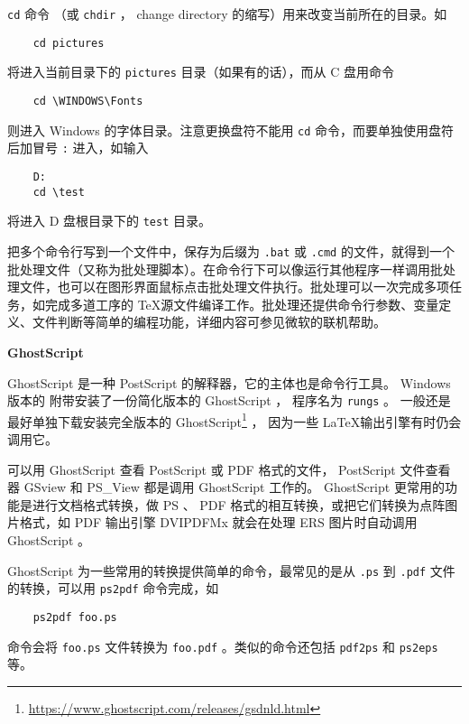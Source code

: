 \verb|cd| 命令 （或 \verb|chdir| ， change directory 的缩写）用来改变当前所在的目录。如
\begin{lstlisting}
    cd pictures
\end{lstlisting}
将进入当前目录下的 \verb|pictures| 目录（如果有的话），而从 C 盘用命令
\begin{lstlisting}
    cd \WINDOWS\Fonts
\end{lstlisting}
则进入 Windows 的字体目录。注意更换盘符不能用 \verb|cd| 命令，而要单独使用盘符后加冒号 \verb|:| 进入，如输入
\begin{lstlisting}
    D:
    cd \test
\end{lstlisting}
将进入 D 盘根目录下的 \verb|test| 目录。

把多个命令行写到一个文件中，保存为后缀为 \verb|.bat| 或 \verb|.cmd| 的文件，就得到一个批处理文件（又称为批处理脚本）。在命令行下可以像运行其他程序一样调用批处理文件，也可以在图形界面鼠标点击批处理文件执行。批处理可以一次完成多项任务，如完成多道工序的 \TeX 源文件编译工作。批处理还提供命令行参数、变量定义、文件判断等简单的编程功能，详细内容可参见微软的联机帮助。

\textbf{GhostScript}

GhostScript 是一种 PostScript 的解释器，它的主体也是命令行工具。 Windows 版本的 \texlive 附带安装了一份简化版本的 GhostScript ， 程序名为 \verb|rungs| 。 一般还是最好单独下载安装完全版本的 GhostScript\footnote{\href{https://www.ghostscript.com/releases/gsdnld.html}{https://www.ghostscript.com/releases/gsdnld.html}} ， 因为一些 \LaTeX 输出引擎有时仍会调用它。

可以用 GhostScript 查看 PostScript 或 PDF 格式的文件， PostScript 文件查看器 GSview 和 PS\_View 都是调用 GhostScript 工作的。 GhostScript 更常用的功能是进行文档格式转换，做 PS 、 PDF 格式的相互转换，或把它们转换为点阵图片格式，如 PDF 输出引擎 DVIPDFMx 就会在处理 ERS 图片时自动调用 GhostScript 。

GhostScript 为一些常用的转换提供简单的命令，最常见的是从 \verb|.ps| 到 \verb|.pdf| 文件的转换，可以用 \verb|ps2pdf| 命令完成，如
\begin{lstlisting}
    ps2pdf foo.ps
\end{lstlisting}
命令会将 \verb|foo.ps| 文件转换为 \verb|foo.pdf| 。类似的命令还包括 \verb|pdf2ps| 和 \verb|ps2eps|等。

